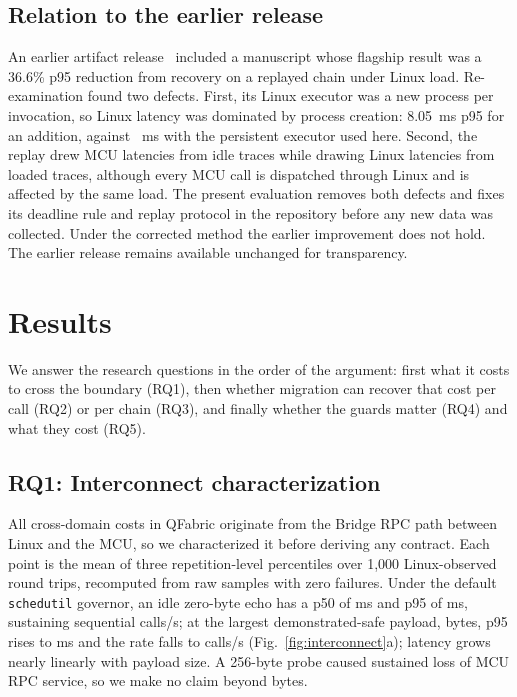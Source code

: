 \documentclass[conference]{IEEEtran}
\newcommand{\system}{QFabric\xspace}
\begin{document}
\subsection{Relation to the earlier release}
\label{sec:correction}
An earlier artifact release~\cite{qfabric2026v101} included a manuscript
whose flagship result was a 36.6\% p95 reduction from recovery on a
replayed chain under Linux load. Re-examination found two defects. First,
its Linux executor was a new process per invocation, so Linux latency was
dominated by process creation: 8.05~ms p95 for an addition, against
\StageTwelveIdleLinuxAddP~ms with the persistent executor used here. Second,
the replay drew MCU latencies from idle traces while drawing Linux latencies
from loaded traces, although every MCU call is dispatched through Linux and
is affected by the same load. The present evaluation removes both defects
and fixes its deadline rule and replay protocol in the repository before any
new data was collected. Under the corrected method the earlier improvement
does not hold. The earlier release remains available unchanged for
transparency.

\section{Results}
\label{sec:results}
We answer the research questions in the order of the argument: first what it
costs to cross the boundary (RQ1), then whether migration can recover that
cost per call (RQ2) or per chain (RQ3), and finally whether the guards matter
(RQ4) and what they cost (RQ5).

\subsection{RQ1: Interconnect characterization}
\label{sec:interconnect}
All cross-domain costs in \system originate from the Bridge RPC path between
Linux and the MCU, so we characterized it before deriving any contract.
Each point is the mean of three repetition-level percentiles over 1,000
Linux-observed round trips, recomputed from \IcRawSamplesVerified{} raw samples
with zero failures. Under the default \texttt{schedutil} governor, an idle
zero-byte echo has a p50 of \IcZeroByteIdlePfifty{} ms and p95 of
\IcZeroByteIdlePninetyfive{} ms, sustaining \IcZeroByteIdleCallsPerSec{}
sequential calls/s; at the largest demonstrated-safe payload,
\IcMaxPayloadBytes{} bytes, p95 rises to \IcMaxPayloadIdlePninetyfive{} ms and
the rate falls to \IcMaxPayloadIdleCallsPerSec{} calls/s
(Fig.~\ref{fig:interconnect}a); latency grows nearly linearly with payload
size. A 256-byte probe caused sustained loss of MCU RPC service, so we
make no claim beyond \IcMaxPayloadBytes{} bytes.
\end{document}
